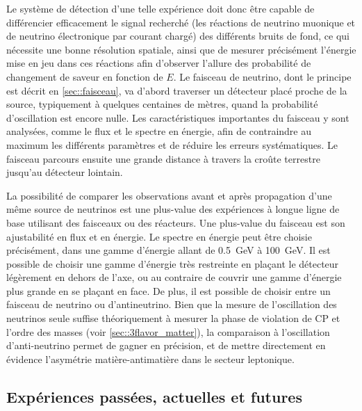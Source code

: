       Le système de détection d'une telle expérience doit donc être capable de différencier efficacement le signal recherché (les réactions de neutrino muonique et de neutrino électronique par courant chargé) des différents bruits de fond, ce qui nécessite une bonne résolution spatiale, ainsi que de mesurer précisément l'énergie mise en jeu dans ces réactions afin d'observer l'allure des probabilité de changement de saveur en fonction de $E$. Le faisceau de neutrino, dont le principe est décrit en \autoref{sec::faisceau}, va d'abord traverser un détecteur placé proche de la source, typiquement à quelques centaines de mètres, quand la probabilité d'oscillation est encore nulle. Les caractéristiques importantes du faisceau y sont analysées, comme le flux et le spectre en énergie, afin de contraindre au maximum les différents paramètres et de réduire les erreurs systématiques. Le faisceau parcours ensuite une grande distance à travers la croûte terrestre jusqu'au détecteur lointain. 
    
      La possibilité de comparer les observations avant et après propagation d'une même source de neutrinos est une plus-value des expériences à longue ligne de base utilisant des faisceaux ou des réacteurs. Une plus-value du faisceau est son ajustabilité en flux et en énergie. Le spectre en énergie peut être choisie précisément, dans une gamme d'énergie allant de \SI{0.5}{\giga\electronvolt} à \SI{100}{\giga\electronvolt}. Il est possible de choisir une gamme d'énergie très restreinte en plaçant le détecteur légèrement en dehors de l'axe, ou au contraire de couvrir une gamme d'énergie plus grande en se plaçant en face. De plus, il est possible de choisir entre un faisceau de neutrino ou d'antineutrino. Bien que la mesure de l'oscillation des neutrinos seule suffise théoriquement à mesurer la phase de violation de CP et l'ordre des masses (voir \autoref{sec::3flavor_matter}), la comparaison à l'oscillation d'anti-neutrino permet de gagner en précision, et de mettre directement en évidence l'asymétrie matière-antimatière dans le secteur leptonique. 

    \subsection{Expériences passées, actuelles et futures}

